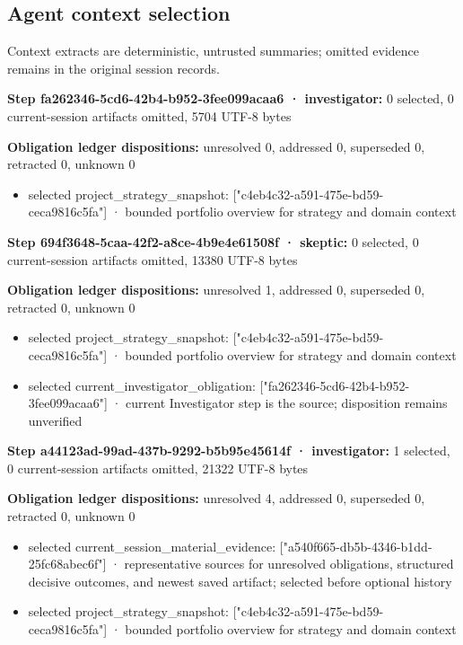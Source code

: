 \documentclass[11pt]{article}
\begin{document}
\subsection{Agent context selection}
Context extracts are deterministic, untrusted summaries; omitted evidence remains in the original session records.\par
\textbf{Step fa262346-5cd6-42b4-b952-3fee099acaa6 · investigator:} 0 selected, 0 current-session artifacts omitted, 5704 UTF-8 bytes\par
\textbf{Obligation ledger dispositions:} unresolved 0, addressed 0, superseded 0, retracted 0, unknown 0\par
\begin{itemize}
\item selected project\_strategy\_snapshot: ["c4eb4c32-a591-475e-bd59-ceca9816c5fa"] · bounded portfolio overview for strategy and domain context
\end{itemize}
\textbf{Step 694f3648-5caa-42f2-a8ce-4b9e4e61508f · skeptic:} 0 selected, 0 current-session artifacts omitted, 13380 UTF-8 bytes\par
\textbf{Obligation ledger dispositions:} unresolved 1, addressed 0, superseded 0, retracted 0, unknown 0\par
\begin{itemize}
\item selected project\_strategy\_snapshot: ["c4eb4c32-a591-475e-bd59-ceca9816c5fa"] · bounded portfolio overview for strategy and domain context
\item selected current\_investigator\_obligation: ["fa262346-5cd6-42b4-b952-3fee099acaa6"] · current Investigator step is the source; disposition remains unverified
\end{itemize}
\textbf{Step a44123ad-99ad-437b-9292-b5b95e45614f · investigator:} 1 selected, 0 current-session artifacts omitted, 21322 UTF-8 bytes\par
\textbf{Obligation ledger dispositions:} unresolved 4, addressed 0, superseded 0, retracted 0, unknown 0\par
\begin{itemize}
\item selected current\_session\_material\_evidence: ["a540f665-db5b-4346-b1dd-25fc68abec6f"] · representative sources for unresolved obligations, structured decisive outcomes, and newest saved artifact; selected before optional history
\item selected project\_strategy\_snapshot: ["c4eb4c32-a591-475e-bd59-ceca9816c5fa"] · bounded portfolio overview for strategy and domain context
\end{itemize}
\end{document}
